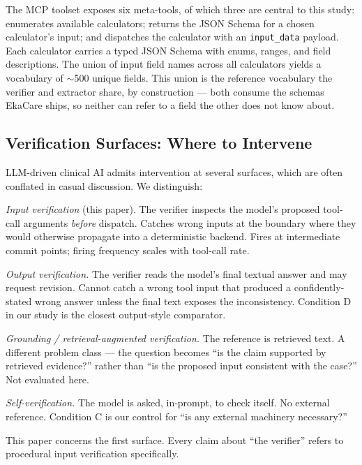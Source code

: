 The MCP toolset exposes six meta-tools, of which three are central to
this study:
 enumerates available calculators;
 returns the JSON Schema for a chosen
calculator's input; and  dispatches the
calculator with an \verb|input_data| payload. Each calculator carries a
typed JSON Schema with enums, ranges, and field descriptions. The union
of input field names across all calculators yields a vocabulary of
$\sim$500 unique fields. This union is the reference vocabulary the
verifier and extractor share, by construction --- both consume the
schemas EkaCare ships, so neither can refer to a field the other does
not know about.

\subsection{Verification Surfaces: Where to Intervene}
\label{sec:bg_surfaces}

LLM-driven clinical AI admits intervention at several surfaces, which
are often conflated in casual discussion. We distinguish:

\textit{Input verification} (this paper). The verifier inspects the
model's proposed tool-call arguments \emph{before} dispatch. Catches
wrong inputs at the boundary where they would otherwise propagate
into a deterministic backend. Fires at intermediate commit points;
firing frequency scales with tool-call rate.

\textit{Output verification.} The verifier reads the model's final
textual answer and may request revision. Cannot catch a wrong tool
input that produced a confidently-stated wrong answer unless the
final text exposes the inconsistency. Condition D in our study is the
closest output-style comparator.

\textit{Grounding / retrieval-augmented verification.} The reference
is retrieved text. A different problem class --- the question becomes
``is the claim supported by retrieved evidence?'' rather than ``is the
proposed input consistent with the case?'' Not evaluated here.

\textit{Self-verification.} The model is asked, in-prompt, to check
itself. No external reference. Condition C is our control for ``is any
external machinery necessary?''

This paper concerns the first surface. Every claim about ``the
verifier'' refers to procedural input verification specifically.

